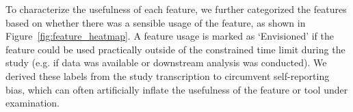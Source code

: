 To characterize the usefulness of each feature, we further categorized the features based on whether there was a sensible usage of the feature, as shown in Figure~\ref{fig:feature_heatmap}. A feature usage is marked as `Envisioned' if the feature could be used practically outside of the constrained time limit during the study (e.g. if data was available or downstream analysis was conducted).
We derived these labels from the study transcription to circumvent self-reporting bias, which can often artificially inflate the usefulness of the feature or tool under examination.

